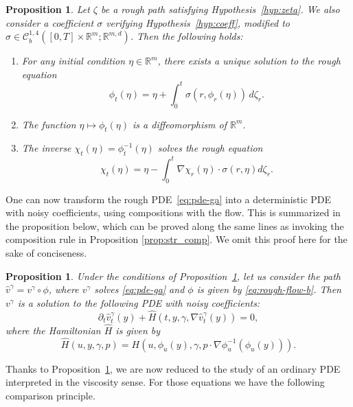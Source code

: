 \documentclass[12pt,reqno]{amsart}
\numberwithin{equation}{section}  %
\newcommand{\1}{{\bf 1}}
\newcommand{\2}{{\bf 2}}
\newcommand{\bzeta}{{\zeta}}
\newcommand{\R}{\mathbb R}
\newcommand{\ga}{\gamma}
\newcommand{\si}{\sigma}
\newtheorem{proposition}[theorem]{Proposition}
\theoremstyle{remark}
\theoremstyle{remark}
\newcommand{\beq}{\begin{equation}}
\newcommand{\eeq}{\end{equation}}
\begin{document}
\begin{proposition}\label{prop:rough-flow-a}
Let $\bzeta$ be a rough path satisfying Hypothesis~\ref{hyp:zeta}. We also consider a coefficient $\si$ verifying Hypothesis~\ref{hyp:coeff}, modified to $\sigma \in \mathcal C_b^{1,4}([0,T]\times \R^m; \R^{m,d})$. Then the following holds:
\begin{enumerate}[wide, labelwidth=!, labelindent=0pt, label=\emph{(\roman*)}]
\setlength\itemsep{.1in}  
    \item For any initial condition $\eta \in \mathbb{R}^m$, there exists a unique solution to the rough equation
    \beq\label{eq:rough-flow-b}
    \phi_t(\eta) = \eta + \int_0^t \si(r, \phi_r(\eta))\,d\bzeta_r .
    \eeq
    \item The function $\eta \mapsto \phi_t(\eta)$ is a diffeomorphism of $\mathbb{R}^m$.
    \item The inverse $\chi_t(\eta) = \phi_t^{-1}(\eta)$ solves the rough equation
    $$
    \chi_t(\eta) = \eta - \int_0^t \nabla \chi_r(\eta) \cdot \si(r, \eta) d \zeta_r.
    $$
\end{enumerate}
\end{proposition}

One can now transform the rough PDE~\eqref{eq:pde-ga} into a deterministic PDE with noisy coefficients, using compositions with the flow. This is summarized in the proposition below, which can be proved along the same lines as \cite[Proposition~4.21]{CHT} invoking the composition rule in Proposition \ref{prop:str_comp}. We omit this proof here for the sake of conciseness.

\begin{proposition}\label{prop:rough-flow-c}
Under the conditions of Proposition~\ref{prop:rough-flow-a}, let us consider the path $\hat{v}^{\ga} = v^{\ga} \circ \phi$, where $v^{\ga}$ solves \eqref{eq:pde-ga} and $\phi$ is given by \eqref{eq:rough-flow-b}. Then $v^{\ga}$ is a solution to the following PDE with noisy coefficients:
$$
\partial_t \hat{v}_t^{\ga}(y) + \hat{H}(t,y,\ga, \nabla \hat{v}_t^{\ga}(y)) = 0,
$$
where the Hamiltonian $\hat{H}$ is given by
\beq\label{eq:H-hat-b}
\hat{H}(u, y, \ga, p) = H(u, \phi_u(y), \ga, p \cdot \nabla \phi_u^{-1}(\phi_u(y))).
\eeq
\end{proposition}

Thanks to Proposition~\ref{prop:rough-flow-c}, we are now reduced to the study of an ordinary PDE interpreted in the viscosity sense. For those equations we have the following comparison principle.
\end{document}
